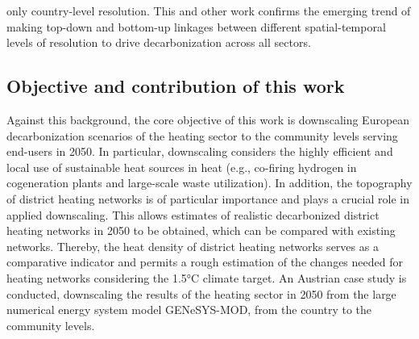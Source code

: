 only country-level resolution. This and other work confirms the emerging trend of making top-down and bottom-up linkages between different spatial-temporal levels of resolution to drive decarbonization across all sectors.\vspace{0.3cm}

\subsection{Objective and contribution of this work}
Against this background, the core objective of this work is downscaling European decarbonization scenarios of the heating sector to the community levels serving end-users in 2050. In particular, downscaling considers the highly efficient and local use of sustainable heat sources in  heat (e.g., co-firing hydrogen in cogeneration plants and large-scale waste utilization). In addition, the topography of district heating networks is of particular importance and plays a crucial role in applied downscaling. This allows estimates of realistic  decarbonized district heating networks in 2050 to be obtained, which can be compared with existing networks. Thereby, the heat density of district heating networks serves as a comparative indicator and permits a rough estimation of the changes needed for  heating networks considering the 1.5°C  climate target. An Austrian case study is conducted, downscaling the  results of the heating sector in 2050 from the large numerical energy system model GENeSYS-MOD, from the country to the community levels. \vspace{0.3cm}

